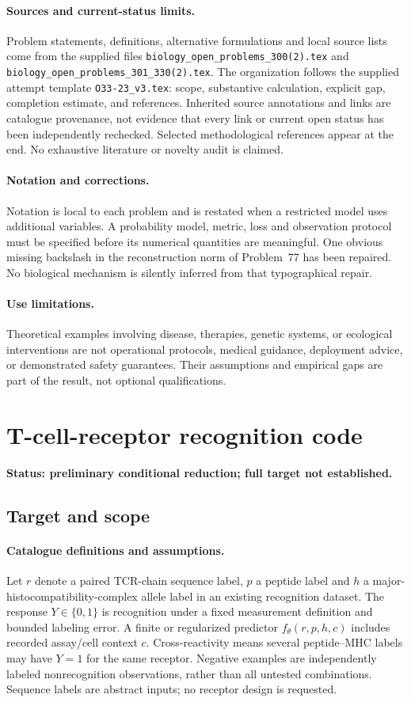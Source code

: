 \documentclass[11pt]{article}
\begin{document}
\paragraph{Sources and current-status limits.}
Problem statements, definitions, alternative formulations and local source lists
come from the supplied files
\texttt{biology\_open\_problems\_300(2).tex} and
\texttt{biology\_open\_problems\_301\_330(2).tex}.
The organization follows the supplied attempt template
\texttt{O33-23\_v3.tex}: scope, substantive calculation, explicit gap,
completion estimate, and references. Inherited source annotations and links are
catalogue provenance, not evidence that every link or current open status has
been independently rechecked. Selected methodological references appear at the
end. No exhaustive literature or novelty audit is claimed.

\paragraph{Notation and corrections.}
Notation is local to each problem and is restated when a restricted model uses
additional variables. A probability model, metric, loss and observation protocol
must be specified before its numerical quantities are meaningful. One obvious
missing backslash in the reconstruction norm of Problem~77 has been repaired.
No biological mechanism is silently inferred from that typographical repair.

\paragraph{Use limitations.}
Theoretical examples involving disease, therapies, genetic systems, or ecological
interventions are not operational protocols, medical guidance, deployment advice,
or demonstrated safety guarantees. Their assumptions and empirical gaps are part
of the result, not optional qualifications.


\section*{T-cell-receptor recognition code}
\label{prob:231}
\noindent\textbf{Status: preliminary conditional reduction; full target not established.}
\subsection{Target and scope}
\paragraph{Catalogue definitions and assumptions.}
Let $r$ denote a paired TCR-chain sequence label, $p$ a peptide label and $h$ a major-histocompatibility-complex allele label in an existing recognition dataset. The response $Y\in\{0,1\}$ is recognition under a fixed measurement definition and bounded labeling error. A finite or regularized predictor $f_\theta(r,p,h,c)$ includes recorded assay/cell context $c$. Cross-reactivity means several peptide--MHC labels may have $Y=1$ for the same receptor. Negative examples are independently labeled nonrecognition observations, rather than all untested combinations. Sequence labels are abstract inputs; no receptor design is requested.
\end{document}
